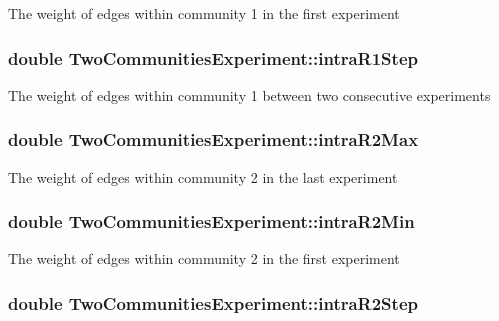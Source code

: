 The weight of edges within community 1 in the first experiment \hypertarget{class_two_communities_experiment_a8d1110034d1f89f1cc5fdfc4d3a09cf4}{
\subsubsection[{intra\-R1\-Step}]{\setlength{\rightskip}{0pt plus 5cm}double Two\-Communities\-Experiment\-::intra\-R1\-Step}}\label{class_two_communities_experiment_a8d1110034d1f89f1cc5fdfc4d3a09cf4}
The weight of edges within community 1 between two consecutive experiments \hypertarget{class_two_communities_experiment_aea1cdf3d8087ad33685ff7caf80b8bc1}{
\subsubsection[{intra\-R2\-Max}]{\setlength{\rightskip}{0pt plus 5cm}double Two\-Communities\-Experiment\-::intra\-R2\-Max}}\label{class_two_communities_experiment_aea1cdf3d8087ad33685ff7caf80b8bc1}
The weight of edges within community 2 in the last experiment \hypertarget{class_two_communities_experiment_afa05e622cd2e95ef81649822f012ffad}{
\subsubsection[{intra\-R2\-Min}]{\setlength{\rightskip}{0pt plus 5cm}double Two\-Communities\-Experiment\-::intra\-R2\-Min}}\label{class_two_communities_experiment_afa05e622cd2e95ef81649822f012ffad}
The weight of edges within community 2 in the first experiment \hypertarget{class_two_communities_experiment_ad958587e2411b3f9d87882fef453f3f6}{
\subsubsection[{intra\-R2\-Step}]{\setlength{\rightskip}{0pt plus 5cm}double Two\-Communities\-Experiment\-::intra\-R2\-Step}}\label{class_two_communities_experiment_ad958587e2411b3f9d87882fef453f3f6}
